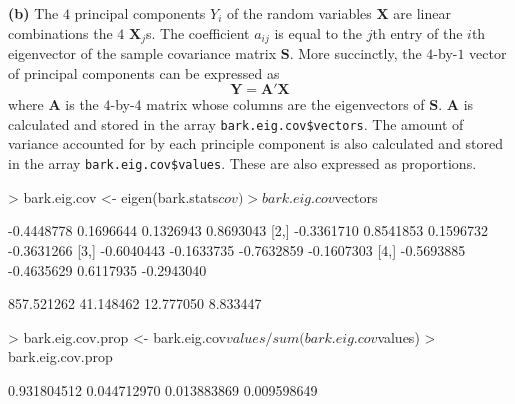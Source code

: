\documentclass[a4paper,11pt]{article}
\begin{document}
{\bf (b)} The $4$ principal components $Y_i$ of the random variables $\mathbf{X}$ are linear combinations the $4$ $\mathbf{X}_j$s. The coefficient $a_{ij}$ is equal to the $j$th entry of the $i$th eigenvector of the sample covariance matrix $\mathbf{S}$. More succinctly, the $4$-by-$1$ vector of principal components can be expressed as
\begin{equation}
\mathbf{Y = A'X}
\label{eigeneqn}
\end{equation}
where $\mathbf{A}$ is the $4$-by-$4$ matrix whose columns are the eigenvectors of $\mathbf{S}$. $\mathbf{A}$ is calculated and stored in the array \texttt{bark.eig.cov\$vectors}. The amount of variance accounted for by each principle component is also calculated and stored in the array \texttt{bark.eig.cov\$values}. These are also expressed as proportions.
\begin{Schunk}
\begin{Sinput}
> bark.eig.cov <- eigen(bark.stats$cov)
> bark.eig.cov$vectors
\end{Sinput}
\begin{Soutput}
           [,1]       [,2]       [,3]       [,4]
[1,] -0.4448778  0.1696644  0.1326943  0.8693043
[2,] -0.3361710  0.8541853  0.1596732 -0.3631266
[3,] -0.6040443 -0.1633735 -0.7632859 -0.1607303
[4,] -0.5693885 -0.4635629  0.6117935 -0.2943040
\end{Soutput}
\begin{Soutput}
[1] 857.521262  41.148462  12.777050   8.833447
\end{Soutput}
\begin{Sinput}
> bark.eig.cov.prop <- bark.eig.cov$values/sum(bark.eig.cov$values)
> bark.eig.cov.prop
\end{Sinput}
\begin{Soutput}
[1] 0.931804512 0.044712970 0.013883869 0.009598649
\end{Soutput}
\end{Schunk}
\\
\end{document}
